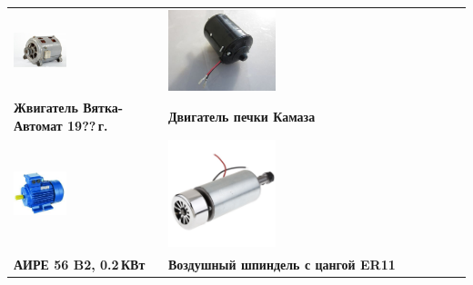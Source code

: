 \begin{tabular}{l l}

\noindent\includegraphics[width=0.37\textwidth]{tech/tools/VyatkaDvig.jpg} 
& 
\noindent\includegraphics[width=0.37\textwidth]{tech/tools/KamazDvig.jpg}
\\
\textbf{Жвигатель Вятка-Автомат 19??\,г.}
&
\textbf{Двигатель печки Камаза}
\\

\noindent\includegraphics[width=0.37\textwidth]{tech/tools/AIRE.jpg}
& 
\noindent\includegraphics[width=0.37\textwidth]{tech/tools/ER11.jpg}
\\
\textbf{АИРЕ 56 B2, 0.2\,КВт}
&
\textbf{Воздушный шпиндель с цангой ER11}
\\

\end{tabular}
\clearpage

